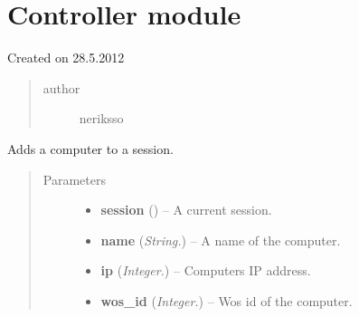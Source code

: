 \documentclass[letterpaper,10pt,english]{sphinxmanual}
\begin{document}
\section{Controller module}
\label{controller:module-controller}\label{controller:controller-module}\label{controller::doc}
Created on 28.5.2012
\begin{quote}\begin{description}
\item[{author}] \leavevmode
neriksso

\end{description}\end{quote}

\begin{fulllineitems}
\label{controller:controller.AddComputerToSession}
Adds a computer to a session.
\begin{quote}\begin{description}
\item[{Parameters}] \leavevmode\begin{itemize}
\item {} 
\textbf{session} ({\hyperref[models:models.Session]{}}) -- A current session.

\item {} 
\textbf{name} (\emph{String.}) -- A name of the computer.

\item {} 
\textbf{ip} (\emph{Integer.}) -- Computers IP address.

\item {} 
\textbf{wos\_id} (\emph{Integer.}) -- Wos id of the computer.

\end{itemize}

\end{description}\end{quote}

\end{fulllineitems}

\end{document}
